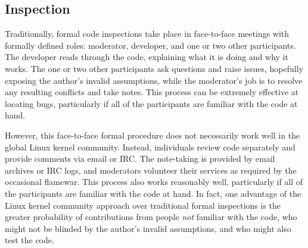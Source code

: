 \subsection{Inspection}
\label{sec:debugging:Inspection}

Traditionally, formal code inspections take place in face-to-face meetings
with formally defined roles: moderator, developer, and one or two other
participants.
The developer reads through the code, explaining what it is doing and
why it works.
The one or two other participants ask questions and raise issues,
hopefully exposing the author's invalid assumptions, while the moderator's
job is to resolve any resulting conflicts and take notes.
This process can be extremely effective at locating bugs, particularly
if all of the participants are familiar with the code at hand.

However, this face-to-face formal procedure does not necessarily
work well in the global Linux kernel community.
Instead, individuals review code separately and provide comments via
email or IRC\@.
The note-taking is provided by email archives or IRC logs, and moderators
volunteer their services as required by the occasional flamewar.
This process also works reasonably well, particularly if all of the
participants are familiar with the code at hand.
In fact, one advantage of the Linux kernel community approach over
traditional formal inspections is the greater probability of contributions
from people \emph{not} familiar with the code, who might not be blinded
by the author's invalid assumptions, and who might also test the code.

